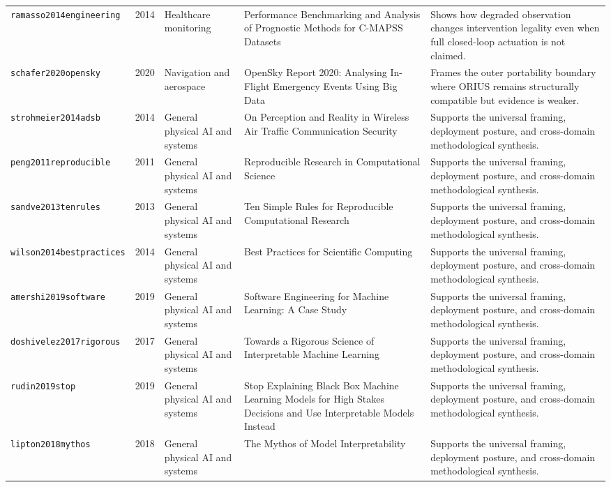 \begin{longtable}{p{}p{}p{}p{}p{}}
\texttt{ramasso2014engineering} & 2014 & Healthcare monitoring & Performance Benchmarking and Analysis of Prognostic Methods for C-MAPSS Datasets & Shows how degraded observation changes intervention legality even when full closed-loop actuation is not claimed.\\
\texttt{schafer2020opensky} & 2020 & Navigation and aerospace & OpenSky Report 2020: Analysing In-Flight Emergency Events Using Big Data & Frames the outer portability boundary where ORIUS remains structurally compatible but evidence is weaker.\\
\texttt{strohmeier2014adsb} & 2014 & General physical AI and systems & On Perception and Reality in Wireless Air Traffic Communication Security & Supports the universal framing, deployment posture, and cross-domain methodological synthesis.\\
\texttt{peng2011reproducible} & 2011 & General physical AI and systems & Reproducible Research in Computational Science & Supports the universal framing, deployment posture, and cross-domain methodological synthesis.\\
\texttt{sandve2013tenrules} & 2013 & General physical AI and systems & Ten Simple Rules for Reproducible Computational Research & Supports the universal framing, deployment posture, and cross-domain methodological synthesis.\\
\texttt{wilson2014bestpractices} & 2014 & General physical AI and systems & Best Practices for Scientific Computing & Supports the universal framing, deployment posture, and cross-domain methodological synthesis.\\
\texttt{amershi2019software} & 2019 & General physical AI and systems & Software Engineering for Machine Learning: A Case Study & Supports the universal framing, deployment posture, and cross-domain methodological synthesis.\\
\texttt{doshivelez2017rigorous} & 2017 & General physical AI and systems & Towards a Rigorous Science of Interpretable Machine Learning & Supports the universal framing, deployment posture, and cross-domain methodological synthesis.\\
\texttt{rudin2019stop} & 2019 & General physical AI and systems & Stop Explaining Black Box Machine Learning Models for High Stakes Decisions and Use Interpretable Models Instead & Supports the universal framing, deployment posture, and cross-domain methodological synthesis.\\
\texttt{lipton2018mythos} & 2018 & General physical AI and systems & The Mythos of Model Interpretability & Supports the universal framing, deployment posture, and cross-domain methodological synthesis.\\

\end{longtable}
